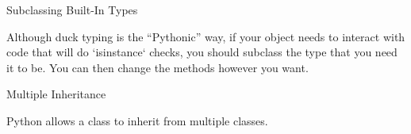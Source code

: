 \documentclass[aspectratio=149, handout] {beamer}
\begin{document}
\begin{frame}[fragile]{Subclassing Built-In Types}
  
  
  Although duck typing is the ``Pythonic'' way, if your object needs to interact with code that will do \inline`isinstance` checks,
  you should subclass the type that you need it to be.  
  You can then change the methods however you want.
  
  
\end{frame}

\begin{frame}[fragile]{Multiple Inheritance}
  
  Python allows a class to inherit from multiple classes.
  
  
\end{frame}



\end{document}
